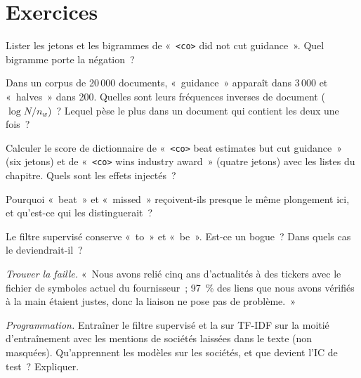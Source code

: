 \section{Exercices}

\begin{exercise}[$\star$]\label{exo:ml:text-from-bag-of-words-to-embeddings:1}
Lister les jetons et les bigrammes de «~\texttt{<co>} did not cut guidance~». Quel bigramme porte la négation~?
\end{exercise}

\begin{exercise}[$\star$]\label{exo:ml:text-from-bag-of-words-to-embeddings:2}
Dans un corpus de 20\,000 documents, «~guidance~» apparaît dans 3\,000 et «~halves~» dans 200. Quelles sont leurs fréquences
inverses de document ($\log N/n_w$)~? Lequel pèse le plus dans un document qui contient les deux une fois~?
\end{exercise}

\begin{exercise}[$\star$]\label{exo:ml:text-from-bag-of-words-to-embeddings:3}
Calculer le score de dictionnaire de «~\texttt{<co>} beat estimates but cut guidance~» (six jetons) et de «~\texttt{<co>} wins
industry award~» (quatre jetons) avec les listes du chapitre. Quels sont les effets injectés~?
\end{exercise}

\begin{exercise}[$\star\star$]\label{exo:ml:text-from-bag-of-words-to-embeddings:4}
Pourquoi «~beat~» et «~missed~» reçoivent-ils presque le même plongement ici, et qu'est-ce qui les distinguerait~?
\end{exercise}

\begin{exercise}[$\star\star$]\label{exo:ml:text-from-bag-of-words-to-embeddings:5}
Le filtre supervisé conserve «~to~» et «~be~». Est-ce un bogue~? Dans quels cas le deviendrait-il~?
\end{exercise}

\begin{exercise}[$\star\star$]\label{exo:ml:text-from-bag-of-words-to-embeddings:6}
\emph{Trouver la faille.} «~Nous avons relié cinq ans d'actualités à des tickers avec le fichier de symboles actuel du fournisseur~; 97~\% des liens que nous
avons vérifiés à la main étaient justes, donc la liaison ne pose pas de problème.~»
\end{exercise}

\begin{exercise}[$\star\star\star$]\label{exo:ml:text-from-bag-of-words-to-embeddings:7}
\emph{Programmation.} Entraîner le filtre supervisé et la  sur TF-IDF sur la moitié d'entraînement avec les
mentions de sociétés laissées dans le texte (non masquées). Qu'apprennent les modèles sur les sociétés, et que devient l'IC de test~? Expliquer.
\end{exercise}

